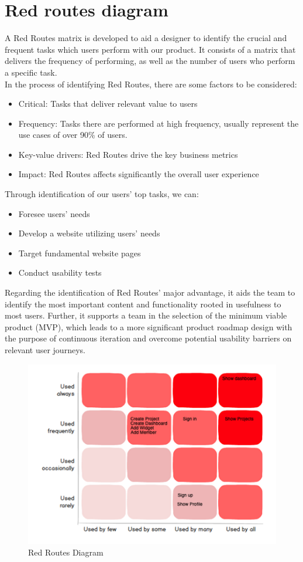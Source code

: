 \documentclass[a4paper,twoside,10pt]{report}
\begin{document}
\section{Red routes diagram}
A  Red Routes matrix is developed to aid a designer to identify the crucial and frequent tasks which users perform with our product. It consists of a matrix that delivers the frequency of performing,  as well as the number of users who perform a specific task.
\\ \newline
In the process of identifying Red Routes, there are some factors to be considered:
\begin{itemize}
	\item  Critical: Tasks that deliver relevant value to users
 	\item Frequency: Tasks there are performed at high frequency, usually represent the use cases of over 90\% of users.
 	\item Key-value drivers: Red Routes drive the key business metrics
 	\item  Impact: Red Routes affects significantly the overall user experience
\end{itemize}
Through identification of our users' top tasks, we can:
\begin{itemize}
	\item Foresee users' needs
	\item Develop a website utilizing users' needs
	\item Target fundamental website pages
	\item Conduct usability tests
\end{itemize}	
Regarding the identification of Red Routes' major advantage, it aids the team to identify the most important content and functionality rooted in usefulness to most users.  Further, it supports a team in the selection of the minimum viable product (MVP), which leads to a more significant product roadmap design with the purpose of continuous iteration and overcome potential usability barriers on relevant user journeys. 
\begin{figure}[h!]
\center
    \includegraphics[width=\textwidth]{red-routes-diagram.png}
\caption{Red Routes Diagram}
\end{figure}
\newpage
\end{document}
